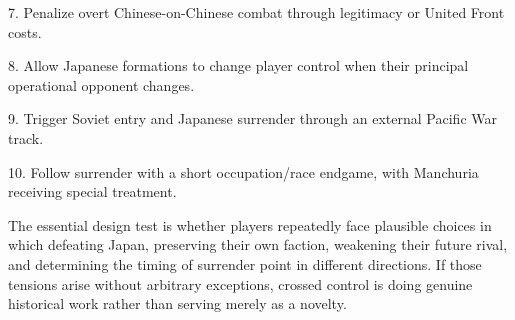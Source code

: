\documentclass[11pt]{article}
\begin{document}
7. Penalize overt Chinese-on-Chinese combat through legitimacy or United Front costs.


8. Allow Japanese formations to change player control when their principal operational opponent changes.


9. Trigger Soviet entry and Japanese surrender through an external Pacific War track.


10. Follow surrender with a short occupation/race endgame, with Manchuria receiving special treatment.


The essential design test is whether players repeatedly face plausible choices in which defeating Japan, preserving their own faction, weakening their future rival, and determining the timing of surrender point in different directions. If those tensions arise without arbitrary exceptions, crossed control is doing genuine historical work rather than serving merely as a novelty.
\end{document}
